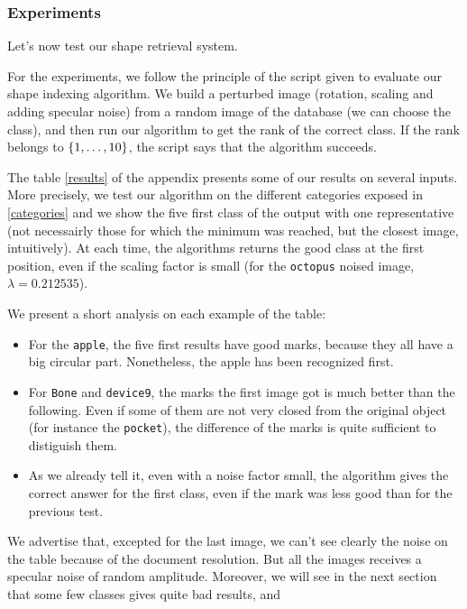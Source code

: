 \subsubsection{Experiments}

Let's now test our shape retrieval system.

For the experiments, we follow the principle of the script given to evaluate our shape indexing algorithm. We build a perturbed image (rotation, scaling and adding specular noise) from a random image of the database (we can choose the class), and then run our algorithm to get the rank of the correct class. If the rank belongs to $\left\{ 1,\dots,10 \right\}$, the script says that the algorithm succeeds.

The table \ref{results} of the appendix presents some of our results on several inputs. More precisely, we test our algorithm on the different categories exposed in \ref{categories} and we show the five first class of the output with one representative (not necessairly those for which the minimum was reached, but the closest image, intuitively). At each time, the algorithms returns the good class at the first position, even if the scaling factor is small (for the \texttt{octopus} noised image, $\lambda = 0.212535$).

We present a short analysis on each example of the table:

\begin{itemize}
	\item For the \texttt{apple}, the five first results have good marks, because they all have a big circular part. Nonetheless, the apple has been recognized first.
	\item For \texttt{Bone} and \texttt{device9}, the marks the first image got is much better than the following. Even if some of them are not very closed from the original object (for instance the \texttt{pocket}), the difference of the marks is quite sufficient to distiguish them.
	\item As we already tell it, even with a noise factor small, the algorithm gives the correct answer for the first class, even if the mark was less good than for the previous test.
\end{itemize}

We advertise that, excepted for the last image, we can't see clearly the noise on the table because of the document resolution. But all the images receives a specular noise of random amplitude. Moreover, we will see in the next section that some few classes gives quite bad results, and 

